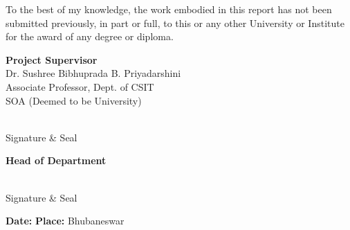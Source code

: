 \vspace{0.25in}

\noindent
To the best of my knowledge, the work embodied in this report has not been submitted previously, in part or full, to this or any other University or Institute for the award of any degree or diploma.

\vspace{0.8in}

\noindent
\begin{minipage}[t]{0.45\textwidth}
\raggedright

\textbf{Project Supervisor}\\[0.12in]

Dr. Sushree Bibhuprada B. Priyadarshini\\
Associate Professor, Dept. of CSIT\\
SOA (Deemed to be University)

\vspace{1in}

\underline{\hspace{5cm}}\\
Signature \& Seal

\end{minipage}
\hfill
\begin{minipage}[t]{0.35\textwidth}
\raggedright

\textbf{Head of Department}

\vspace{1.6in}

\underline{\hspace{5cm}}\\
Signature \& Seal

\end{minipage}

\vspace{0.6in}

\noindent
\textbf{Date:} \underline{\hspace{4cm}}
\hfill
\textbf{Place:} Bhubaneswar

\newpage